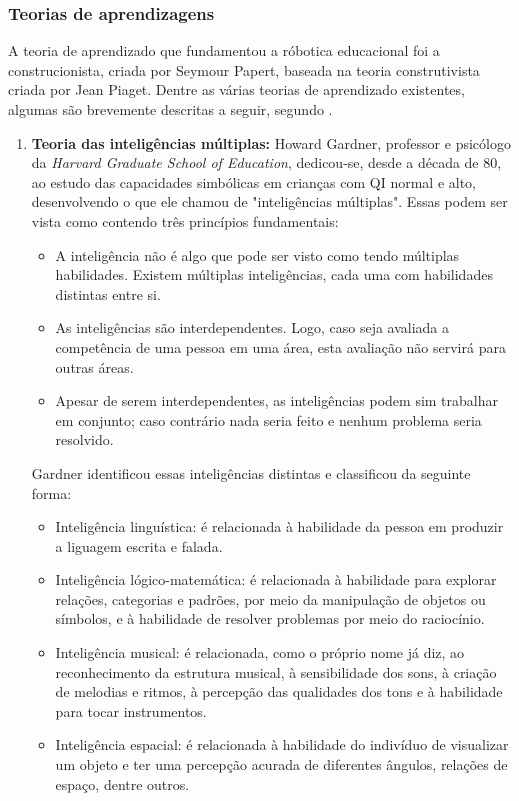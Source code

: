 \subsubsection{Teorias de aprendizagens}
A teoria de aprendizado que fundamentou a róbotica educacional foi a construcionista, criada por Seymour Papert, baseada na teoria construtivista criada por Jean Piaget. Dentre as várias teorias de aprendizado existentes, algumas são brevemente descritas a seguir, segundo \cite{zilli2004robotica}.
\begin{enumerate}
\item \textbf{Teoria das inteligências múltiplas:} Howard Gardner, professor e psicólogo da \textit{Harvard Graduate School of Education}, dedicou-se, desde a década de 80, ao estudo das capacidades simbólicas em crianças com QI normal e alto, desenvolvendo o que ele chamou de "inteligências múltiplas". Essas podem ser vista como contendo três princípios fundamentais:
\begin{itemize}
\item A inteligência não é algo que pode ser visto como tendo múltiplas habilidades. Existem múltiplas inteligências, cada uma com habilidades distintas entre si.
\item  As inteligências são interdependentes. Logo, caso seja avaliada a competência de uma pessoa em uma área, esta avaliação não servirá para outras áreas.
\item Apesar de serem interdependentes, as inteligências podem sim trabalhar em conjunto; caso contrário nada seria feito e nenhum problema seria resolvido.
\end{itemize}
Gardner identificou essas inteligências distintas e classificou da seguinte forma:
\begin{itemize}
\item Inteligência linguística: é relacionada à habilidade da pessoa em produzir a liguagem escrita e falada.
\item Inteligência lógico-matemática: é relacionada à habilidade para explorar relações, categorias e padrões, por meio da manipulação de objetos ou símbolos, e à habilidade de resolver problemas por meio do raciocínio.
\item Inteligência musical: é relacionada, como o próprio nome já diz, ao reconhecimento da estrutura musical, à sensibilidade dos sons, à criação de melodias e ritmos, à percepção das qualidades dos tons e à habilidade para tocar instrumentos.
\item Inteligência espacial: é relacionada à habilidade do indivíduo de visualizar um objeto e ter uma percepção acurada de diferentes ângulos, relações de espaço, dentre outros.

\end{itemize}
\end{enumerate}

